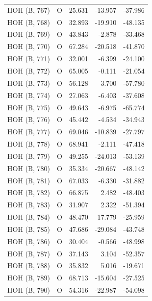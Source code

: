 \begin{longtable}{@{}lcrr@{}}
  \cmidrule(r){1-5}
  HOH (B, 767) & O & 25.631 & -13.957 & -37.986 \\
  \cmidrule(r){1-5}
  HOH (B, 768) & O & 32.893 & -19.910 & -48.135 \\
  \cmidrule(r){1-5}
  HOH (B, 769) & O & 43.843 & -2.878 & -33.468 \\
  \cmidrule(r){1-5}
  HOH (B, 770) & O & 67.284 & -20.518 & -41.870 \\
  \cmidrule(r){1-5}
  HOH (B, 771) & O & 32.001 & -6.399 & -24.100 \\
  \cmidrule(r){1-5}
  HOH (B, 772) & O & 65.005 & -0.111 & -21.054 \\
  \cmidrule(r){1-5}
  HOH (B, 773) & O & 56.128 & 3.700 & -57.780 \\
  \cmidrule(r){1-5}
  HOH (B, 774) & O & 27.063 & -6.403 & -37.608 \\
  \cmidrule(r){1-5}
  HOH (B, 775) & O & 49.643 & -6.975 & -65.774 \\
  \cmidrule(r){1-5}
  HOH (B, 776) & O & 45.442 & -4.534 & -34.943 \\
  \cmidrule(r){1-5}
  HOH (B, 777) & O & 69.046 & -10.839 & -27.797 \\
  \cmidrule(r){1-5}
  HOH (B, 778) & O & 68.941 & -2.111 & -47.418 \\
  \cmidrule(r){1-5}
  HOH (B, 779) & O & 49.255 & -24.013 & -53.139 \\
  \cmidrule(r){1-5}
  HOH (B, 780) & O & 35.334 & -20.667 & -48.142 \\
  \cmidrule(r){1-5}
  HOH (B, 781) & O & 67.033 & -6.330 & -31.882 \\
  \cmidrule(r){1-5}
  HOH (B, 782) & O & 66.875 & 2.482 & -48.403 \\
  \cmidrule(r){1-5}
  HOH (B, 783) & O & 31.907 & 2.322 & -51.394 \\
  \cmidrule(r){1-5}
  HOH (B, 784) & O & 48.470 & 17.779 & -25.959 \\
  \cmidrule(r){1-5}
  HOH (B, 785) & O & 47.686 & -29.084 & -43.748 \\
  \cmidrule(r){1-5}
  HOH (B, 786) & O & 30.404 & -0.566 & -48.998 \\
  \cmidrule(r){1-5}
  HOH (B, 787) & O & 37.143 & 3.104 & -52.357 \\
  \cmidrule(r){1-5}
  HOH (B, 788) & O & 35.832 & 5.016 & -19.671 \\
  \cmidrule(r){1-5}
  HOH (B, 789) & O & 68.713 & -15.604 & -27.525 \\
  \cmidrule(r){1-5}
  HOH (B, 790) & O & 54.316 & -22.987 & -54.098 \\

\end{longtable}

